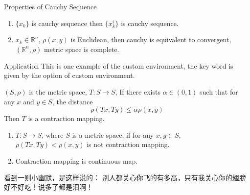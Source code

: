 \documentclass[color=green,mathpazo,titlestyle=hang]{elegantbook}
\begin{document}
\begin{property}
Properties of Cauchy Sequence
\begin{enumerate}\parskip=0pt \itemsep=0pt
\item $\{x_k\}$ is cauchy sequence then $\{x_k^i\}$ is cauchy sequence.
\item $x_k\in \mathbb{R}^n$, $\rho(x,y)$ is Euclidean, then cauchy is equivalent to convergent, $(\mathbb{R}^n,\rho)$ metric space is complete.
\end{enumerate}
\end{property}


\lipsum[7]

\begin{custom}{Application}
This is one example of the custom environment, the key word is given by the option of custom environment.
\end{custom}


\lipsum[6]
\begin{newdef}
$(S,\rho)$ is the metric space, $T: S\to S$, If there exists $\alpha\in(0,1)$ such that for any $x$ and $y\in S$, the distance
\begin{equation}
\rho(Tx,Ty)\leq \alpha\rho(x,y)
\end{equation}
Then $T$ is a {\color{main} contraction mapping}.
\end{newdef}

\begin{remark}
\begin{enumerate}
\parskip=0pt \itemsep=0pt
\item $T:S\to S$, where $S$ is a metric space, if  for any $x,y\in S$, $\rho(Tx,Ty)<\rho(x,y)$ is not contraction mapping.
\item Contraction mapping is continuous map.
\end{enumerate}
\end{remark}


\begin{conclusion}
看到一则小幽默，是这样说的：{\color{main} 别人都关心你飞的有多高，只有我关心你的翅膀好不好吃！}说多了都是泪啊！
\end{conclusion}




\end{document}
